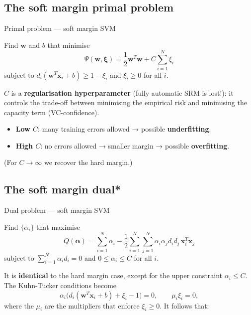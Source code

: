 \subsection{The soft margin primal
problem}\label{il-problema-primale-soft-margin}

\begin{boxdefinition}{Primal problem --- soft margin SVM}

Find \(\mathbf{w}\) and \(b\) that minimise \[
\Psi(\mathbf{w}, \boldsymbol{\xi}) = \frac{1}{2}\mathbf{w}^T\mathbf{w} + C\sum_{i=1}^{N}\xi_i
\] subject to \(d_i(\mathbf{w}^T\mathbf{x}_i + b) \ge 1 - \xi_i\) and
\(\xi_i \ge 0\) for all \(i\).

\end{boxdefinition}

\(C\) is a \textbf{regularisation hyperparameter} (fully automatic SRM
is lost!): it controls the trade-off between minimising the empirical
risk and minimising the capacity term (VC-confidence).

\begin{itemize}
\tightlist
\item
  \textbf{Low \(C\)}: many training errors allowed → possible
  \textbf{underfitting}.
\item
  \textbf{High \(C\)}: no errors allowed → smaller margin → possible
  \textbf{overfitting}.
\end{itemize}

(For \(C \to \infty\) we recover the hard margin.)

\subsection{The soft margin dual*}\label{il-duale-soft-margin}

\begin{boxdefinition}{Dual problem --- soft margin SVM}

Find \(\{\alpha_i\}\) that maximise \[
Q(\boldsymbol{\alpha}) = \sum_{i=1}^{N}\alpha_i - \frac{1}{2}\sum_{i=1}^{N}\sum_{j=1}^{N}\alpha_i\alpha_j d_i d_j\,\mathbf{x}_i^T\mathbf{x}_j
\] subject to \(\sum_{i=1}^{N}\alpha_i d_i = 0\) and
\(0 \le \alpha_i \le C\) for all \(i\).

\end{boxdefinition}

It is \textbf{identical} to the hard margin case, except for the upper
constraint \(\alpha_i \le C\). The Kuhn-Tucker conditions become \[
\alpha_i\big(d_i(\mathbf{w}^T\mathbf{x}_i + b) + \xi_i - 1\big) = 0, \qquad \mu_i\xi_i = 0,
\] where the \(\mu_i\) are the multipliers that enforce
\(\xi_i \ge 0\). It follows that:

